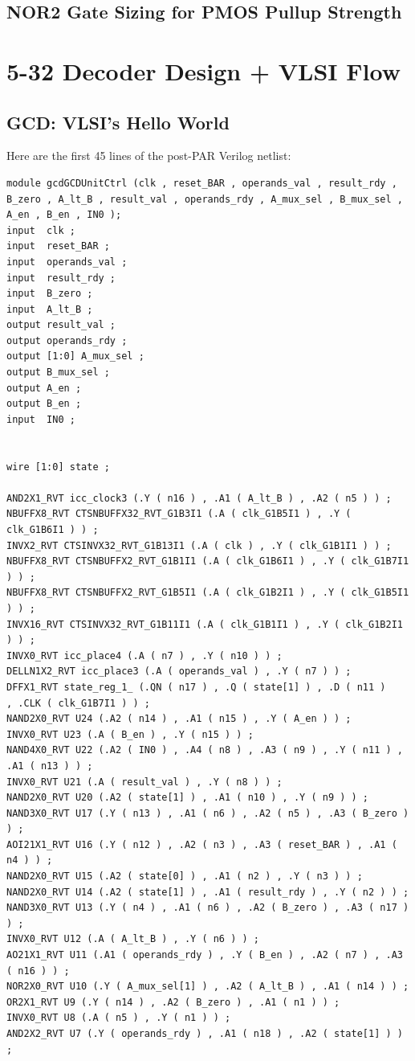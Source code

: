 \documentclass[11pt]{article}
\begin{document}
\subsection{NOR2 Gate Sizing for PMOS Pullup Strength}

\section{5-32 Decoder Design + VLSI Flow}

\subsection{GCD: VLSI's Hello World}

Here are the first 45 lines of the post-PAR Verilog netlist:
\begin{verbatim}
module gcdGCDUnitCtrl (clk , reset_BAR , operands_val , result_rdy , 
B_zero , A_lt_B , result_val , operands_rdy , A_mux_sel , B_mux_sel , 
A_en , B_en , IN0 );
input  clk ;
input  reset_BAR ;
input  operands_val ;
input  result_rdy ;
input  B_zero ;
input  A_lt_B ;
output result_val ;
output operands_rdy ;
output [1:0] A_mux_sel ;
output B_mux_sel ;
output A_en ;
output B_en ;
input  IN0 ;


wire [1:0] state ;

AND2X1_RVT icc_clock3 (.Y ( n16 ) , .A1 ( A_lt_B ) , .A2 ( n5 ) ) ;
NBUFFX8_RVT CTSNBUFFX32_RVT_G1B3I1 (.A ( clk_G1B5I1 ) , .Y ( clk_G1B6I1 ) ) ;
INVX2_RVT CTSINVX32_RVT_G1B13I1 (.A ( clk ) , .Y ( clk_G1B1I1 ) ) ;
NBUFFX8_RVT CTSNBUFFX2_RVT_G1B1I1 (.A ( clk_G1B6I1 ) , .Y ( clk_G1B7I1 ) ) ;
NBUFFX8_RVT CTSNBUFFX2_RVT_G1B5I1 (.A ( clk_G1B2I1 ) , .Y ( clk_G1B5I1 ) ) ;
INVX16_RVT CTSINVX32_RVT_G1B11I1 (.A ( clk_G1B1I1 ) , .Y ( clk_G1B2I1 ) ) ;
INVX0_RVT icc_place4 (.A ( n7 ) , .Y ( n10 ) ) ;
DELLN1X2_RVT icc_place3 (.A ( operands_val ) , .Y ( n7 ) ) ;
DFFX1_RVT state_reg_1_ (.QN ( n17 ) , .Q ( state[1] ) , .D ( n11 ) 
, .CLK ( clk_G1B7I1 ) ) ;
NAND2X0_RVT U24 (.A2 ( n14 ) , .A1 ( n15 ) , .Y ( A_en ) ) ;
INVX0_RVT U23 (.A ( B_en ) , .Y ( n15 ) ) ;
NAND4X0_RVT U22 (.A2 ( IN0 ) , .A4 ( n8 ) , .A3 ( n9 ) , .Y ( n11 ) , .A1 ( n13 ) ) ;
INVX0_RVT U21 (.A ( result_val ) , .Y ( n8 ) ) ;
NAND2X0_RVT U20 (.A2 ( state[1] ) , .A1 ( n10 ) , .Y ( n9 ) ) ;
NAND3X0_RVT U17 (.Y ( n13 ) , .A1 ( n6 ) , .A2 ( n5 ) , .A3 ( B_zero ) ) ;
AOI21X1_RVT U16 (.Y ( n12 ) , .A2 ( n3 ) , .A3 ( reset_BAR ) , .A1 ( n4 ) ) ;
NAND2X0_RVT U15 (.A2 ( state[0] ) , .A1 ( n2 ) , .Y ( n3 ) ) ;
NAND2X0_RVT U14 (.A2 ( state[1] ) , .A1 ( result_rdy ) , .Y ( n2 ) ) ;
NAND3X0_RVT U13 (.Y ( n4 ) , .A1 ( n6 ) , .A2 ( B_zero ) , .A3 ( n17 ) ) ;
INVX0_RVT U12 (.A ( A_lt_B ) , .Y ( n6 ) ) ;
AO21X1_RVT U11 (.A1 ( operands_rdy ) , .Y ( B_en ) , .A2 ( n7 ) , .A3 ( n16 ) ) ;
NOR2X0_RVT U10 (.Y ( A_mux_sel[1] ) , .A2 ( A_lt_B ) , .A1 ( n14 ) ) ;
OR2X1_RVT U9 (.Y ( n14 ) , .A2 ( B_zero ) , .A1 ( n1 ) ) ;
INVX0_RVT U8 (.A ( n5 ) , .Y ( n1 ) ) ;
AND2X2_RVT U7 (.Y ( operands_rdy ) , .A1 ( n18 ) , .A2 ( state[1] ) ) ;
\end{verbatim}
\end{document}
